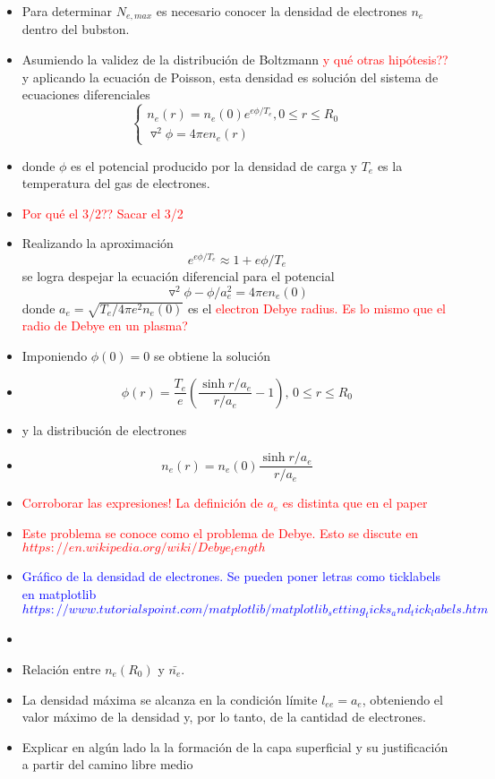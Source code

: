 \documentclass[aps,prb,twocolumn,superscriptaddress,floatfix,longbibliography,10pt]{revtex4-2}
\newcounter{para}
\begin{document}
\begin{itemize}
  \item Para determinar $N_{e, max}$ es necesario conocer la densidad de electrones $n_e$ dentro del bubston.
  \item Asumiendo la validez de la distribución de Boltzmann \textcolor{red}{y qué otras hipótesis??} y aplicando la ecuación de Poisson, esta densidad es solución del sistema de ecuaciones diferenciales
  \[
  \left\{\begin{matrix}
    n_e(r) = n_e(0)e^{e \phi / T_e}, 0 \leq r \leq R_0 \\
    \triangledown^2 \phi = 4 \pi e n_e(r)
  \end{matrix}\right.
  \]
  \item donde $\phi$ es el potencial producido por la densidad de carga y $T_e$ es la temperatura del gas de electrones.
  \item \textcolor{red}{Por qué el $3/2$?? Sacar el 3/2}
  \item Realizando la aproximación
  \[e^{e \phi / T_e} \approx 1 + e \phi/T_e \]
  se logra despejar la ecuación diferencial para el potencial
  \[\triangledown^2 \phi - \phi/a_e^2 = 4 \pi e n_e(0) \]
  donde
  $a_e = \sqrt{T_e/4\pi e^2 n_e(0)}$
  es el \textcolor{red}{electron Debye radius. Es lo mismo que el radio de Debye en un plasma?}

  \item Imponiendo $\phi(0) = 0$ se obtiene la solución
  \item \[\phi(r) = \frac{T_e}{e} \left ( \frac{\sinh{r/a_e}}{r/a_e} - 1   \right ), \, 0 \leq r \leq R_0 \]
  \item y la distribución de electrones
  \item \[n_e(r) = n_e(0) \frac{\sinh{r/a_e}}{r/a_e} \]
  \item \textcolor{red}{Corroborar las expresiones! La definición de $a_e$ es distinta que en el paper}
  \item \textcolor{red}{Este problema se conoce como el problema de Debye. Esto se discute en $https://en.wikipedia.org/wiki/Debye_length$}

  \item \textcolor{blue}{Gráfico de la densidad de electrones. Se pueden poner letras como ticklabels en matplotlib $https://www.tutorialspoint.com/matplotlib/matplotlib_setting_ticks_and_tick_labels.htm$}
  \item 
  \item Relación entre $n_e(R_0)$ y $\bar{n_e}$.
  \item La densidad máxima se alcanza en la condición límite $l_{ee} = a_e$, obteniendo el valor máximo de la densidad y, por lo tanto, de la cantidad de electrones.
  
  \item Explicar en algún lado la la formación de la capa superficial y su justificación a partir del camino libre medio
  
\end{itemize}
\end{document}
